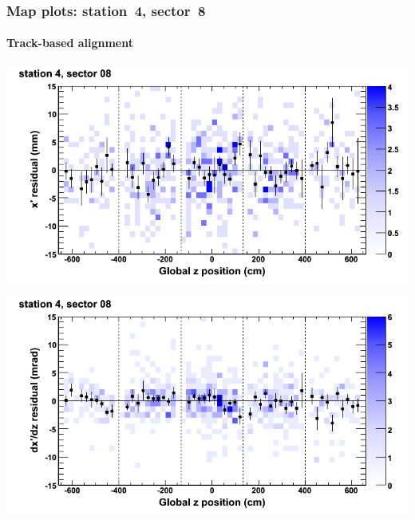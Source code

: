 \documentclass[compress]{beamer}
\begin{document}
\begin{frame}
\frametitle{Map plots: station~4, sector~8}
\framesubtitle{Track-based alignment}
\includegraphics[width=0.5\linewidth]{mapplots_re05/DTvsz_st4sec08_x.png}

\includegraphics[width=0.5\linewidth]{mapplots_re05/DTvsz_st4sec08_dxdz.png}
\end{frame}
\end{document}
